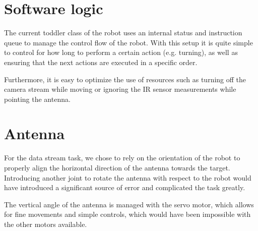 \documentclass{article}
\begin{document}
\section*{Software logic}

The current toddler class of the robot uses an internal status and instruction queue to manage the control flow of the robot. With this setup it is quite simple to control for how long to perform a certain action (e.g. turning), as well as ensuring that the next actions are executed in a specific order.

 Furthermore, it is easy to optimize the use of resources such as turning off the camera stream while moving or ignoring the IR sensor measurements while pointing the antenna. 

\section*{Antenna}

For the data stream task, we chose to rely on the orientation of the robot to properly align the horizontal direction of the antenna towards the target. Introducing another joint to rotate the antenna with respect to the robot would have introduced a significant source of error and complicated the task greatly. 

The vertical angle of the antenna is managed with the servo motor, which allows for fine movements and simple controls, which would have been impossible with the other motors available.
\end{document}
